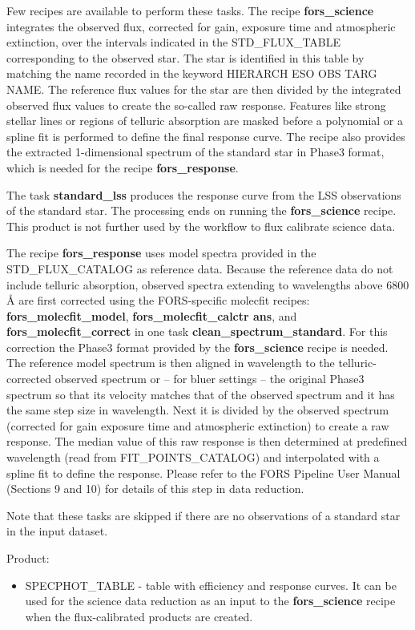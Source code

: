 Few recipes are available to perform these tasks. The recipe 
{\bf fors\_science} integrates the observed flux, corrected for gain, exposure time and atmospheric extinction, over the intervals indicated in the STD\_FLUX\_TABLE corresponding to the observed star.
The star is identified in this table by matching the name recorded in the keyword HIERARCH ESO OBS TARG NAME. The reference flux values for the star are then divided by the integrated observed flux values to create the so-called raw response. Features like strong stellar lines or regions of telluric absorption are masked before a polynomial or a spline fit is performed to define the final response curve. The recipe also provides the extracted 1-dimensional spectrum of the standard star in Phase3 format, which is needed for
the recipe {\bf fors\_response}.

The task {\bf standard\_lss} produces the response curve from the LSS observations of the standard star. The processing ends on running the {\bf fors\_science} recipe. This product is not further used by the workflow to flux calibrate science data.

The recipe {\bf fors\_response} uses model spectra provided in the STD\_FLUX\_CATALOG as reference data. Because the reference data do not include telluric absorption, observed spectra extending to wavelengths above 6800 Å are first corrected using the FORS-specific molecfit recipes: {\bf fors\_molecfit\_model},
{\bf fors\_molecfit\_calctr ans}, and {\bf fors\_molecfit\_correct} in one task {\bf clean\_spectrum\_standard}.
For this correction the Phase3 format provided by the {\bf fors\_science} recipe is needed.
The reference model spectrum is then aligned in wavelength to the telluric-corrected observed spectrum
or – for bluer settings – the original Phase3 spectrum so that its velocity matches that of the observed
spectrum and it has the same step size in wavelength. Next it is divided by the observed spectrum (corrected for gain exposure time and atmospheric extinction) to create a raw response. The median value of this raw response is then determined at predefined wavelength (read from FIT\_POINTS\_CATALOG)
and interpolated with a spline fit to define the response.
Please refer to the FORS Pipeline User Manual (Sections 9 and 10) for details of this step in data reduction.

Note that these tasks are skipped if there are no observations of a standard star in the input dataset. 


Product:
\begin{itemize}
\item SPECPHOT\_TABLE - table with efficiency and response curves. It can be used for the science data reduction as an input to the {\bf fors\_science} recipe when the flux-calibrated products are created.

\end{itemize}

